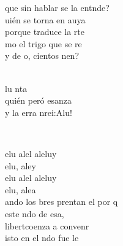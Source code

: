 \documentclass[12pt]{article}
\begin{document}
\begin{multicols*}{2}
\begin{cancion}
	que sin hablar se la entnde?\\
\jump
	uién se torna en auya\\
	porque traduce la rte\\
	mo el trigo que se re \\
	y de o, cientos nen?\\\jump\\
	\begin{chorus}%
	lu nta \\
	quién peró esanza\\
	y la erra nrei:Alu!\\
	\end{chorus}%
	\jump\\
\end{cancion}%

\begin{cancion}%
	elu  alel aleluy\\
	elu, aley\\
	elu  alel aleluy\\
	elu, alea\\
\jump
	ando los bres prentan el por q \\
	 este ndo de esa,\\
	 libertcoenza a convenr\\
	isto en el ndo fue le\\
\end{cancion}%


\end{multicols*}
\end{document}
